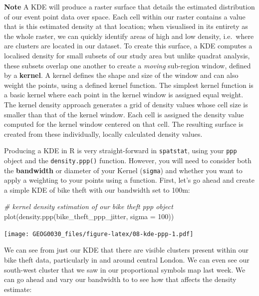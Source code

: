 \documentclass[
]{book}
\newenvironment{Shaded}{\begin{snugshade}}{\end{snugshade}}
\newcommand{\AttributeTok}[1]{\textcolor[rgb]{0.77,0.63,0.00}{#1}}
\newcommand{\CommentTok}[1]{\textcolor[rgb]{0.56,0.35,0.01}{\textit{#1}}}
\newcommand{\DecValTok}[1]{\textcolor[rgb]{0.00,0.00,0.81}{#1}}
\newcommand{\FunctionTok}[1]{\textcolor[rgb]{0.00,0.00,0.00}{#1}}
\newcommand{\NormalTok}[1]{#1}
\begin{document}
\textbf{Note}
A KDE will produce a raster surface that details the estimated distribution of our event point data over space. Each cell within our raster contains a value that is this estimated density at that location; when visualised in its entirety as the whole raster, we can quickly identify areas of high and low density, i.e.~where are clusters are located in our dataset. To create this surface, a KDE computes a localised density for small subsets of our study area but unlike quadrat analysis, these subsets overlap one another to create a \emph{moving} sub-region window, defined by a \textbf{kernel}. A kernel defines the shape and size of the window and can also weight the points, using a defined kernel function. The simplest kernel function is a basic kernel where each point in the kernel window is assigned equal weight. The kernel density approach generates a grid of density values whose cell size is smaller than that of the kernel window. Each cell is assigned the density value computed for the kernel window centered on that cell. The resulting surface is created from these individually, locally calculated density values.

Producing a KDE in R is very straight-forward in \texttt{spatstat}, using your \texttt{ppp} object and the \texttt{density.ppp()} function. However, you will need to consider both the \textbf{bandwidth} or diameter of your Kernel (\texttt{sigma}) and whether you want to apply a weighting to your points using a function. First, let's go ahead and create a simple KDE of bike theft with our bandwidth set to 100m:

\begin{Shaded}
\begin{Highlighting}[]
\CommentTok{\# kernel density estimation of our bike theft ppp object}
\FunctionTok{plot}\NormalTok{(}\FunctionTok{density.ppp}\NormalTok{(bike\_theft\_ppp\_jitter, }\AttributeTok{sigma =} \DecValTok{100}\NormalTok{))}
\end{Highlighting}
\end{Shaded}

\texttt{[image: GEOG0030\_files/figure-latex/08-kde-ppp-1.pdf]}

We can see from just our KDE that there are visible clusters present within our bike theft data, particularly in and around central London. We can even see our south-west cluster that we saw in our proportional symbols map last week. We can go ahead and vary our bandwidth to to see how that affects the density estimate:
\end{document}
